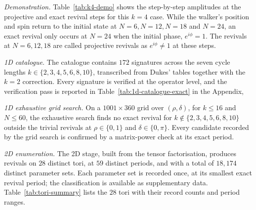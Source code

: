\emph{Demonstration.}
Table~\ref{tab:k4-demo} shows the step-by-step amplitudes at the
projective and exact revival steps for this $k = 4$ case. While
the walker's position and spin return to the initial state
at $N=6, N=12, N=18$ and $N=24$, an exact
revival only occurs at $N = 24$ when the initial phase, $e^{i\phi} = 1$.  
The revivals at $N = 6, 12, 18$ are called projective revivals as $e^{i\phi} \neq 1$
at these steps.

\emph{1D catalogue.}
The catalogue contains $172$ signatures across the seven cycle
lengths $k \in \{2, 3, 4, 5, 6, 8, 10\}$, transcribed from Dukes'
tables together with the $k = 2$ correction. Every signature is
verified at the operator level, and the verification pass is
reported in Table~\ref{tab:1d-catalogue-exact} in the Appendix, 

\emph{1D exhaustive grid search.}
On a $1001 \times 360$ grid over $(\rho, \delta)$, for $k \le 16$
and $N \le 60$, the exhaustive search finds no exact revival for
$k \notin \{2, 3, 4, 5, 6, 8, 10\}$ outside the trivial revivals
at $\rho \in \{0, 1\}$ and $\delta \in \{0, \pi\}$. Every candidate
recorded by the grid search is confirmed by a matrix-power check at
its exact period.  

\emph{2D enumeration.}
The 2D stage, built from the tensor factorisation, produces
revivals on $28$ distinct tori, at $59$ distinct periods, and with
a total of $18{,}174$ distinct parameter sets. Each parameter set is
recorded once, at its smallest exact revival period; the
classification is available as supplementary data.
Table~\ref{tab:tori-summary} lists the $28$ tori with their record
counts and period ranges.
